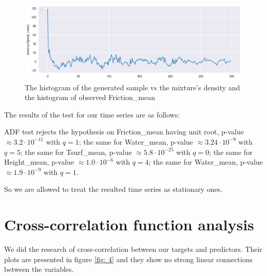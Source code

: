 \documentclass[12pt, bachelor, substylefile = algo_title.rtx]{disser}
\theoremstyle{definition}
\begin{document}
\begin{figure}[!h]
\begin{minipage}{.48\textwidth}
   \end{minipage}\\
\centering
\begin{minipage}{.48\textwidth}
     \includegraphics[width=\linewidth]{acov5}
   \end{minipage}
\caption{The histogram of the generated sample vs the mixture's density and the histogram of observed Friction\_mean}
\label{fig: 3}
\end{figure}

The results of the test for our time series are as follows:
\begin{outline}
\1 ADF test rejects the hypothesis on Friction\_mean having unit root, p-value $\approx 3.2\cdot 10^{-11}$ with $q = 1$;
\1 the same for Water\_mean, p-value $\approx 3.24\cdot 10^{-9}$ with $q = 5$;
\1 the same for Tsurf\_mean, p-value $\approx 5.8 \cdot 10^{-25}$ with $q = 0$;
\1 the same for Height\_mean, p-value $\approx 1.0\cdot 10^{-6}$ with $q = 4$;
\1 the same for Water\_mean, p-value $\approx 1.9\cdot 10^{-9}$ with $q = 1$.
\end{outline}

So we are allowed to treat the resulted time series as stationary ones.

\section{Cross-correlation function analysis}

We did the research of cross-correlation between our targets and predictors. Their plots are presented in figure \ref{fig: 4} and they show no strong linear connections between the variables.
\end{document}
